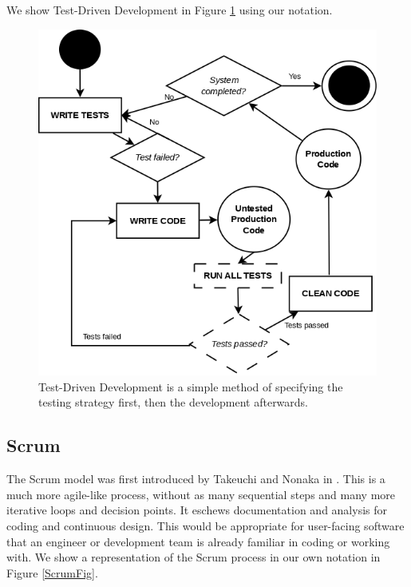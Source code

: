 We show Test-Driven Development in Figure \ref{TDD} using our notation.

\begin{figure}
	\centering
	\includegraphics[scale=0.35]{media/TDD}
	\caption{Test-Driven Development is a simple method of specifying the testing strategy first, then
		the development afterwards.}
	\label{TDD}
\end{figure}

\subsection{Scrum}
The Scrum model was first introduced by Takeuchi and Nonaka in \cite{takeuchi1986new}.
This is a much more agile-like process, without as many sequential steps and many more iterative
loops and decision points.
It eschews documentation and analysis for coding and continuous design.
This would be appropriate for user-facing software that an engineer or development team is already
familiar in coding or working with.
We show a representation of the Scrum process in our own notation in Figure \ref{ScrumFig}.

